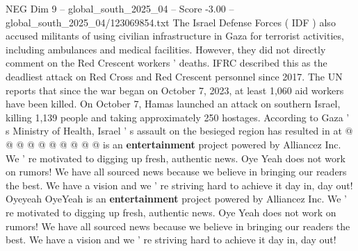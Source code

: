 \begin{textsample}{NEG Dim 9 – global\_south\_2025\_04 – Score -3.00 – global\_south\_2025\_04/123069854.txt}
The Israel Defense Forces ( IDF ) also accused militants of using civilian infrastructure in Gaza for terrorist activities, including ambulances and medical facilities.
However, they did not directly comment on the Red Crescent workers ' deaths.
IFRC described this as the deadliest attack on Red Cross and Red Crescent personnel since 2017.
The UN reports that since the war began on October 7, 2023, at least 1,060 aid workers have been killed.
On October 7, Hamas launched an attack on southern Israel, killing 1,139 people and taking approximately 250 hostages.
According to Gaza ' s Ministry of Health, Israel ' s assault on the besieged region has resulted in at @ @ @ @ @ @ @ @ @ @ is an \textbf{entertainment} project powered by Alliancez Inc.
We ' re motivated to digging up fresh, authentic news.
Oye Yeah does not work on rumors!
We have all sourced news because we believe in bringing our readers the best.
We have a vision and we ' re striving hard to achieve it day in, day out!
Oyeyeah OyeYeah is an \textbf{entertainment} project powered by Alliancez Inc.
We ' re motivated to digging up fresh, authentic news.
Oye Yeah does not work on rumors!
We have all sourced news because we believe in bringing our readers the best.
We have a vision and we ' re striving hard to achieve it day in, day out!

\end{textsample}
